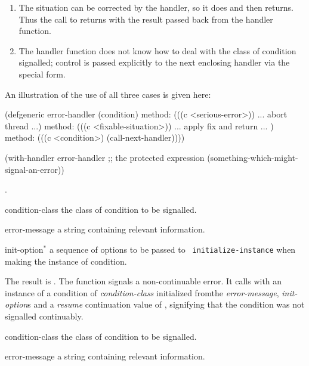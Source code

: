 \begin{optDefinition}
\begin{enumerate}
    \item The situation can be corrected by the handler, so it does and then
    returns. Thus the call to  returns with the result
    passed back from the handler function.

    \item The handler function does not know how to deal with the class of
    condition signalled; control is passed explicitly to the next enclosing
    handler via the  special form.
\end{enumerate}
%
An illustration of the use of all three cases is given here:
%
\begin{example}
\label{example:with-handler}
{\codeExample
(defgeneric error-handler (condition)
   method: (((c <serious-error>))
            ... abort thread ...)
   method: (((c <fixable-situation>))
            ... apply fix and return ... )
   method: (((c <condition>) (call-next-handler))))

(with-handler error-handler
      ;; the protected expression
      (something-which-might-signal-an-error))
\endCodeExample}
\end{example}
%
\seealso%
.

%
\begin{arguments}
    \item[condition-class] the class of condition to be signalled.

    \item[error-message] a string containing relevant information.

    \item[init-option\/$^*$] a sequence of options to be passed to {\tt
        initialize-instance} when making the instance of condition.
\end{arguments}
%
\result%
The result is \nil{}.
%
\remarks%
The  function signals a non-continuable error.  It calls
 with an instance of a condition of {\em condition-class}
initialized fromthe {\em error-message}, {\em init-option}\/s and a {\em resume}
continuation value of \nil{}, signifying that the condition was not signalled
continuably.

%
\begin{arguments}
    \item[condition-class] the class of condition to be signalled.

    \item[error-message] a string containing relevant information.


\end{arguments}
\end{optDefinition}
